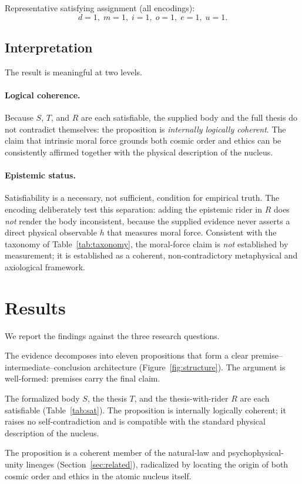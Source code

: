 \documentclass[11pt,a4paper]{article}
\begin{document}
Representative satisfying assignment (all encodings):
\[
d=1,\; m=1,\; i=1,\; o=1,\; e=1,\; u=1 .
\]

\subsection{Interpretation}
\label{sec:interp}

The result is meaningful at two levels.

\paragraph{Logical coherence.}
Because $S$, $T$, and $R$ are each satisfiable, the supplied body and the full
thesis do not contradict themselves: the proposition is \emph{internally
logically coherent}. The claim that intrinsic moral force grounds both cosmic
order and ethics can be consistently affirmed together with the physical
description of the nucleus.

\paragraph{Epistemic status.}
Satisfiability is a necessary, not sufficient, condition for empirical truth.
The encoding deliberately test this separation: adding the epistemic rider in
$R$ does \emph{not} render the body inconsistent, because the supplied
evidence never asserts a direct physical observable $h$ that measures moral
force. Consistent with the taxonomy of Table~\ref{tab:taxonomy}, the moral-force
claim is \emph{not} established by measurement; it is established as a coherent,
non-contradictory metaphysical and axiological framework.

\section{Results}
\label{sec:results}

We report the findings against the three research questions.

\begin{description}[leftmargin=2em]
  \item[\textbf{RQ1 (structure).}] The evidence decomposes into eleven
        propositions that form a clear premise--intermediate--conclusion
        architecture (Figure~\ref{fig:structure}). The argument is
        well-formed: premises carry the final claim.
  \item[\textbf{RQ2 (consistency).}] The formalized body $S$, the thesis $T$,
        and the thesis-with-rider $R$ are each satisfiable
        (Table~\ref{tab:sat}). The proposition is internally logically
        coherent; it raises no self-contradiction and is compatible with the
        standard physical description of the nucleus.
  \item[\textbf{RQ3 (relation to tradition).}] The proposition is a coherent
        member of the natural-law and psychophysical-unity lineages
        (Section~\ref{sec:related}), radicalized by locating the origin of
        both cosmic order and ethics in the atomic nucleus itself.
\end{description}
\end{document}
